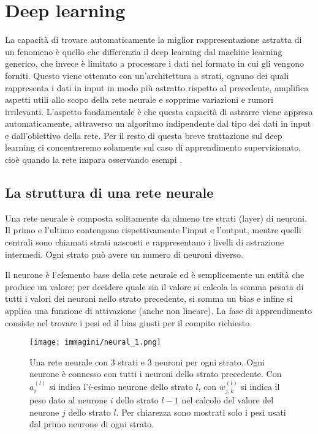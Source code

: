 \documentclass[12pt]{report}
\begin{document}
\section{Deep learning}
La capacità di trovare automaticamente la miglior rappresentazione astratta di un fenomeno è quello che differenzia il deep learning dal machine learning generico, che invece è limitato a processare i dati nel formato in cui gli vengono forniti. Questo viene ottenuto con un'architettura a strati, ognuno dei quali rappresenta i dati in input in modo più astratto rispetto al precedente, amplifica aspetti utili allo scopo della rete neurale e sopprime variazioni e rumori irrilevanti. L'aspetto fondamentale è che questa capacità di astrarre viene appresa automaticamente, attraverso un algoritmo indipendente dal tipo dei dati in input e dall'obiettivo della rete. Per il resto di questa breve trattazione sul deep learning ci concentreremo solamente sul caso di apprendimento supervisionato, cioè quando la rete impara osservando esempi \cite{deeplearning, deeplearningbook, deeplearningnielsen}.

\subsection{La struttura di una rete neurale}
Una rete neurale è composta solitamente da almeno tre strati (layer) di neuroni. Il primo e l'ultimo contengono rispettivamente l'input e l'output, mentre quelli centrali sono chiamati strati nascosti e rappresentano i livelli di astrazione intermedi. Ogni strato può avere un numero di neuroni diverso.

Il neurone è l'elemento base della rete neurale ed è semplicemente un entità che produce un valore; per decidere quale sia il valore si calcola la somma pesata di tutti i valori dei neuroni nello strato precedente, si somma un bias e infine si applica una funzione di attivazione (anche non lineare). La fase di apprendimento consiste nel trovare i pesi ed il bias giusti per il compito richiesto.
\begin{figure}[!htb]
\centering
\texttt{[image: immagini/neural\_1.png]}
\caption{\footnotesize{Una rete neurale con 3 strati e 3 neuroni per ogni strato. Ogni neurone è connesso con tutti i neuroni dello strato precedente. Con $a_i^{(l)}$ si indica l'$i$-esimo neurone dello strato $l$, con $w_{j,k}^{(l)}$ si indica il peso dato al neurone $i$ dello strato $l-1$ nel calcolo del valore del neurone $j$ dello strato $l$. Per chiarezza sono mostrati solo i pesi usati dal primo neurone di ogni strato.}}
\label{fig:neural_1}
\end{figure}
\end{document}
